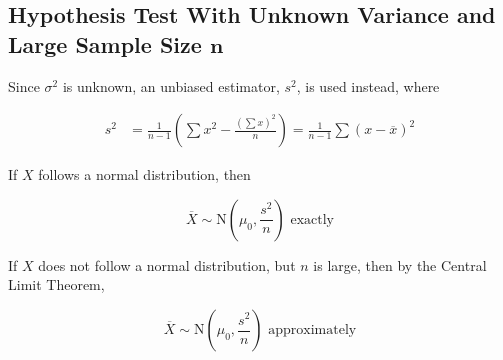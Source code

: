 \documentclass[11pt,a4paper]{book}
\begin{document}
\subsection{Hypothesis Test With Unknown Variance and Large Sample Size $\boldsymbol{n}$}

Since $\sigma^{2}$ is unknown, an unbiased estimator, $s^{2}$, is
used instead, where

\begin{align*}
s^{2} & =\frac{1}{n-1}\left(\sum x^{2}-\frac{\left(\sum x\right)^{2}}{n}\right)=\frac{1}{n-1}\sum\left(x-\overline{x}\right)^{2}
\end{align*}

If $X$ follows a normal distribution, then

\[
\overline{X}\sim\text{N}\left(\mu_{0},\frac{s^{2}}{n}\right)\text{ exactly}
\]

If $X$ does not follow a normal distribution, but $n$ is large,
then by the Central Limit Theorem,

\[
\overline{X}\sim\text{N}\left(\mu_{0},\frac{s^{2}}{n}\right)\text{ approximately}
\]
\end{document}

